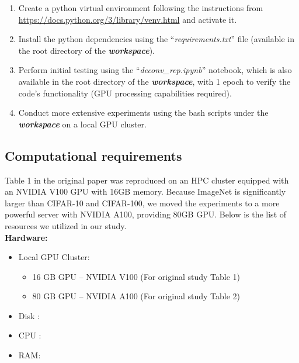 \begin{enumerate}
    \item Create a python virtual environment following the instructions from \url{https://docs.python.org/3/library/venv.html} and activate it.
    \item Install the python dependencies using the ``\textit{requirements.txt}'' file (available in the root directory of the \textbf{\textit{workspace}}).  
    \item Perform initial testing using the ``\textit{deconv\_rep.ipynb}'' notebook, which is also available in the root directory of the \textbf{\textit{workspace}}, with 1 epoch to verify the code's functionality (GPU processing capabilities required).
    \item Conduct more extensive experiments using the bash scripts under the \textbf{\textit{workspace}} on a local GPU cluster.
\end{enumerate}


\subsection{Computational requirements}
\label{sec:Computational-requirements}


Table 1 in the original paper was reproduced on an HPC cluster equipped with an NVIDIA V100 GPU with 16GB memory. Because ImageNet is significantly larger than CIFAR-10 and CIFAR-100, we moved the experiments to a more powerful server with NVIDIA A100, providing 80GB GPU.  Below is the list of resources we utilized in our study.\\

\textbf{Hardware:}

\begin{itemize}
    \item Local GPU Cluster: 
        \begin{itemize}[label=$\diamond$]
            \item 16 GB GPU – NVIDIA V100 (For original study Table 1)
            \item 80 GB GPU – NVIDIA A100 (For original study Table 2)
        \end{itemize}
    \item Disk :  
    \item CPU : 
    \item RAM:  
\end{itemize}

